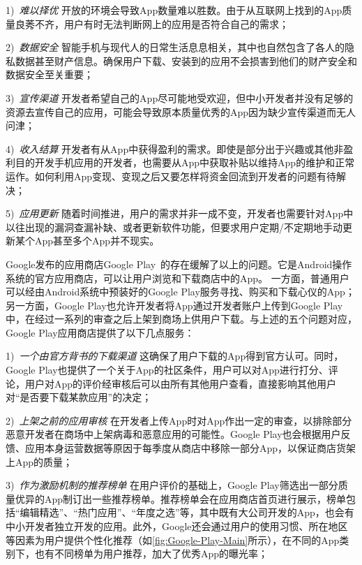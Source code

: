 1)\ \emph{难以择优} \quad
开放的环境会导致App数量难以胜数。由于从互联网上找到的App质量良莠不齐，用户有时无法判断网上的应用是否符合自己的需求；

2)\ \emph{数据安全} \quad
智能手机与现代人的日常生活息息相关，其中也自然包含了各人的隐私数据甚至财产信息。确保用户下载、安装到的应用不会损害到他们的财产安全和数据安全至关重要；

3)\ \emph{宣传渠道} \quad
开发者希望自己的App尽可能地受欢迎，但中小开发者并没有足够的资源去宣传自己的应用，可能会导致原本质量优秀的App因为缺少宣传渠道而无人问津；

4)\ \emph{收入结算} \quad
开发者有从App中获得盈利的需求。即使是部分出于兴趣或其他非盈利目的开发手机应用的开发者，也需要从App中获取补贴以维持App的维护和正常运作。如何利用App变现、变现之后又要怎样将资金回流到开发者的问题有待解决；

5)\ \emph{应用更新} \quad
随着时间推进，用户的需求并非一成不变，开发者也需要针对App中以往出现的漏洞查漏补缺、或者更新软件功能，但要求用户定期/不定期地手动更新某个App甚至多个App并不现实。

Google发布的应用商店Google Play~\cite{GooglePlay}的存在缓解了以上的问题。它是Android操作系统的官方应用商店，可以让用户浏览和下载商店中的App。
一方面，普通用户可以经由Android系统中预装好的Google Play服务寻找、购买和下载心仪的App；另一方面，Google Play也允许开发者将App通过开发者账户上传到Google Play中，在经过一系列的审查之后上架到商场上供用户下载。与上述的五个问题对应，Google Play应用商店提供了以下几点服务：

1)\ \emph{一个由官方背书的下载渠道} \quad
这确保了用户下载的App得到官方认可。同时，Google Play也提供了一个关于App的社区条件，用户可以对App进行打分、评论，用户对App的评价经审核后可以由所有其他用户查看，直接影响其他用户对``是否要下载某款应用''的决定；

2)\ \emph{上架之前的应用审核} \quad
在开发者上传App时对App作出一定的审查，以排除部分恶意开发者在商场中上架病毒和恶意应用的可能性。Google Play也会根据用户反馈、应用本身运营数据等原因于每季度从商店中移除一部分App，以保证商店货架上App的质量；

3)\ \emph{作为激励机制的推荐榜单} \quad
在用户评价的基础上，Google Play筛选出一部分质量优异的App制订出一些推荐榜单。推荐榜单会在应用商店首页进行展示，榜单包括``编辑精选''、``热门应用''、``年度之选''等，其中既有大公司开发的App，也会有中小开发者独立开发的应用。此外，Google还会通过用户的使用习惯、所在地区等因素为用户提供个性化推荐（如\autoref{fig:Google-Play-Main}所示），在不同的App类别下，也有不同榜单为用户推荐，加大了优秀App的曝光率；

